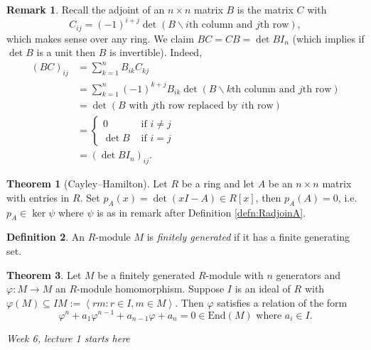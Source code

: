 \documentclass[a4paper]{article}
\newcommand{\la}{\left\langle}
\newcommand{\ra}{\right\rangle}
\newcommand{\End}{\text{End}}
\theoremstyle{definition}
\newtheorem{defn}{Definition}[subsection]
\newtheorem{thm}[defn]{Theorem}
\newtheorem*{remark}{Remark}
\begin{document}
\begin{remark}
Recall the adjoint of an $n\times n$ matrix $B$ is the matrix $C$ with 
\[
C_{ij}=(-1)^{i+j} \det \left(B\backslash i\text{th column and }j\text{th row} \right),
\]
which makes sense over any ring. We claim $BC=CB=\det B I_n$ (which implies if $\det B$ is a unit then $B$ is invertible). Indeed,
\[
\begin{aligned}
(BC)_{ij} &= \sum_{k=1}^n B_{ik} C_{kj}\\
&=\sum_{k=1}^n (-1)^{k+j} B_{ik} \det \left(B\backslash k\text{th column and }j\text{th row} \right)\\
&=\det \left(B\text{ with }j\text{th row replaced by }i\text{th row}\right)\\
&=\left\{ \begin{aligned}
  0 &\text{ if } i\neq j\\ \det B &\text{ if } i= j
\end{aligned} \right. \\
&=\left(\det B I_n\right)_{ij}.
\end{aligned}
\]
\end{remark}

\begin{thm}[Cayley–Hamilton]
Let $R$ be a ring and let $A$ be an $n\times n$ matrix with entries in $R$. Set $p_A(x)=\det (xI-A)\in R[x]$, then $p_A(A)=0$, i.e. $p_A\in\ker\psi$ where $\psi$ is as in remark after Definition \ref{defn:RadjoinA}.
\end{thm}

\begin{defn}
An $R$-module $M$ is \textit{finitely generated} if it has a finite generating set.
\end{defn}

\begin{thm}
\label{thm:generalCH}
Let $M$ be a finitely generated $R$-module with $n$ generators and $\varphi:M\rightarrow M$ an $R$-module homomorphism. Suppose $I$ is an ideal of $R$ with $\varphi(M)\subseteq IM:=\la rm:r\in I,m\in M\ra$. Then $\varphi$ satisfies a relation of the form
\[
\varphi^n + a_1 \varphi^{n-1} + a_{n-1}\varphi + a_n=0 \in\End(M) \text{ where } a_i\in I.
\]
\end{thm}

\begin{flushright}
\textit{Week 6, lecture 1 starts here}
\end{flushright}
\end{document}
